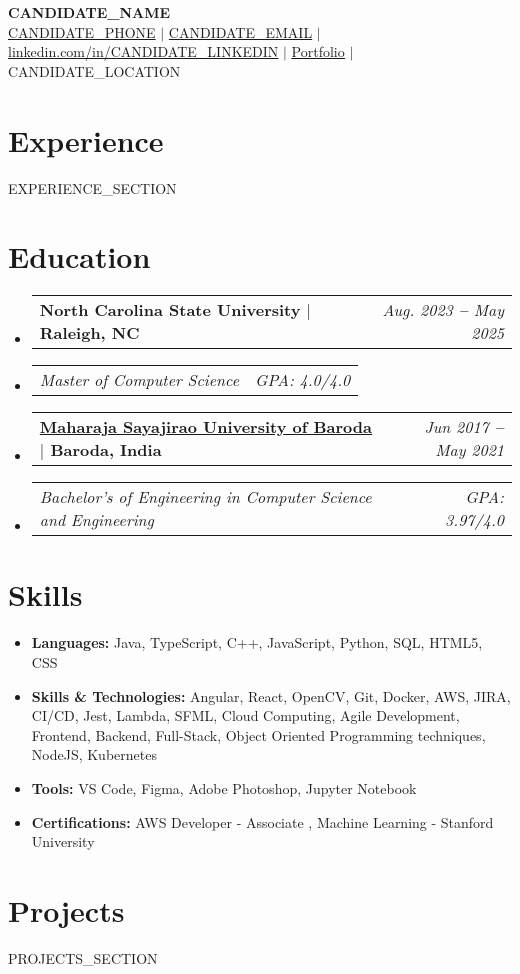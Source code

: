 \documentclass[letterpaper,11pt]{article}
\makeatletter
\def\vspaceAfterBullets{3pt}
\newcommand{\bulletItem}[1]{
  \item\small{
    {#1}
  }
}
\newcommand{\companyNameAndLocationHeading}[2]{
  \item 
    \begin{tabular*}{1.0\textwidth}[b]{l@{\extracolsep{\fill}}r}
      \textbf{#1} & #2
    \end{tabular*}
}
\newcommand{\titleAndDateHeading}[2]{
    \item
    \begin{tabular*}{1.0\textwidth}[b]{l@{\extracolsep{\fill}}r}
      \textit{\small#1} & \textit{\small #2}
    \end{tabular*}
}
\newcommand{\sectionListStart}{\begin{itemize}[leftmargin=0pt, label={}]}
\newcommand{\sectionListEnd}{\end{itemize}}
\makeatother
\begin{document}
\def\spaceAfterLogo{0.5pt}
\begin{center}
  \textbf{\Huge {{CANDIDATE_NAME}}} \\ \vspace{3pt}
  \small
  \hspace{\spaceAfterLogo} \href{tel:{{CANDIDATE_PHONE}}}{{CANDIDATE_PHONE}}
  $|$
   \hspace{\spaceAfterLogo} \href{mailto:{{CANDIDATE_EMAIL}}}{{CANDIDATE_EMAIL}}
  $|$
   \hspace{\spaceAfterLogo} {\underline{\href{https://www.linkedin.com/in/{{CANDIDATE_LINKEDIN}}}{linkedin.com/in/{{CANDIDATE_LINKEDIN}}}}}
  $|$
  \hspace{\spaceAfterLogo} 
  {\underline{{\href{https://{{CANDIDATE_PORTFOLIO}}/}{Portfolio}}}} 
  $|$
  \hspace{\spaceAfterLogo} {{CANDIDATE_LOCATION}}
\end{center}

\section{Experience}
\sectionListStart
{{EXPERIENCE_SECTION}}
\sectionListEnd

\section{Education}
\sectionListStart
\companyNameAndLocationHeading
{North Carolina State University $|$ \small{Raleigh, NC}}{\textit{Aug. 2023 \textbf{--} May 2025}}
\titleAndDateHeading
{Master of Computer Science}{GPA: 4.0/4.0}
\companyNameAndLocationHeading
{\href{https://msub.digitaluniversity.ac/}{Maharaja Sayajirao University of Baroda} $|$ \small{Baroda, India}}{\textit{Jun 2017 \textbf{--} May 2021}}
\titleAndDateHeading
{Bachelor's of Engineering in Computer Science and Engineering}{GPA: 3.97/4.0}
\sectionListEnd

\section{Skills}
\sectionListStart
\bulletItem{\textbf{Languages:}{ Java, TypeScript, C++, JavaScript,  Python, SQL, HTML5, CSS}}
\vspace{\vspaceAfterBullets}
\bulletItem{\textbf{Skills \& Technologies:}{ Angular, React, OpenCV, Git, Docker, AWS, JIRA, CI/CD, Jest, Lambda, SFML, Cloud Computing, Agile Development, Frontend, Backend, Full-Stack, Object Oriented Programming techniques, NodeJS, Kubernetes}}
\vspace{\vspaceAfterBullets}
\bulletItem{\textbf{Tools:}{ VS Code, Figma, Adobe Photoshop, Jupyter Notebook}}
\vspace{\vspaceAfterBullets}
\bulletItem{\textbf{Certifications:}{ {AWS Developer - Associate} \href{https://www.credly.com/badges/d4d4f75b-4cb0-4a20-9894-81c708702ac6/public_url}{\textcolor{blue}{\faLink}}, Machine Learning - Stanford University \href{https://coursera.org/share/c9a90f32d51a5129cb43d1bc746e889a}{\textcolor{blue}{\faLink}}}}
\sectionListEnd

\section{Projects}
\sectionListStart
{{PROJECTS_SECTION}}
\sectionListEnd

\end{document}
